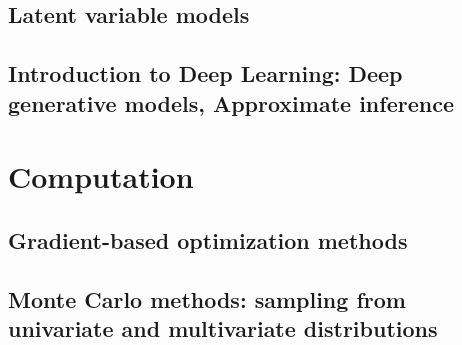 \documentclass{article}
\begin{document}
\subsection{Latent variable models}
\subsection{Introduction to Deep Learning: Deep generative models, Approximate inference}

\section{Computation}
\subsection{Gradient-based optimization methods}
\subsection{Monte Carlo methods: sampling from univariate and multivariate distributions}



\end{document}

